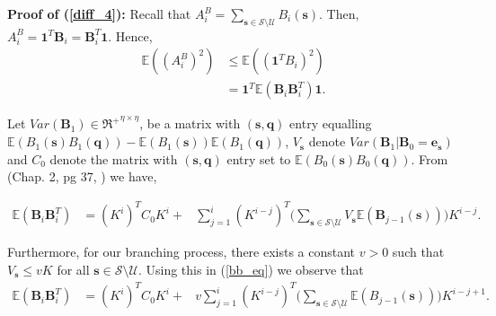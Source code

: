 \documentclass{article}
\theoremstyle{definition}
\newcommand{\lrp}[1]{\left({#1}\right)}
\newcommand{\Exp}[1]{\mathbb{E}\lrp{#1}}
\begin{document}

\noindent \textbf{Proof of (\ref{diff_4}):} Recall that $A^B_i=\sum_{\bm{s}\in \mathcal {S} \setminus \mathcal U}B_i(\bm{s})$. Then, $A^B_i=\bm{1}^T \bm{B}_i= \bm{{B}}_i^T \bm{1}$. Hence,
    \begin{equation} 
      \begin{aligned}
        \Exp{\lrp{A^B_i}^2} &\leq \Exp{(\bm{1}^T {B}_i)^2 } \\
                            &=  \bm{1}^T \Exp{\bm{{B}}_i \bm{{B}}_i^T} \bm{1}.
     \label{affected_square_bound}
      \end{aligned}
    \end{equation}
    
       Let $Var(\bm{B}_1)\in {\Re^+}^{\eta\times\eta}$, be a matrix with $(\bm{s},\bm{q})$ entry equalling $\Exp{B_1(\bm{s})B_1(\bm{q})}-\Exp{B_1(\bm{s})}\Exp{B_1(\bm{q})}$, $V_{\bm{s}}$ denote $Var(\bm{B}_1|\bm{B}_0=\bm{e}_{\bm{s}})$ and $C_0$ denote the matrix with $(\bm{s},\bm{q})$ entry set to $\Exp{B_0(\bm{s})B_0(\bm{q})}$. From (Chap. 2, pg 37, \cite{branching_process_notes_2}) we have,

\begin{equation}
      \begin{aligned}
      \Exp{\bm{{B}}_{i} \bm{{B}}_{i}^T} & = ({K}^i)^T C_0 {K}^i +  &  \sum_{j=1}^{i} ({K}^{i-j})^T \Big(\sum_{\bm{s}\in \mathcal {S} \setminus \mathcal U}V_{\bm{s}}\Exp{\bm{{B}}_{j-1}(\bm{s})}\Big) {K}^{i-j}. 
      \end{aligned}
      \label{bb_eq}
    \end{equation}
 
Furthermore, for our branching process, there exists a constant $v>0$ such that $V_{\bm{s}} \le v {K}$ for all $ \bm{s}\in \mathcal {S} \setminus \mathcal U$. Using this in (\ref{bb_eq}) we observe that
\begin{equation}
      \begin{aligned}
      \Exp{\bm{{B}}_{i} \bm{{B}}^T_{i}} & = ({K}^i)^T C_0 {K}^i +  &  v \sum_{j=1}^{i} ({K}^{i-j})^T \Big(\sum_{\bm{s}\in \mathcal {S} \setminus \mathcal {U}}\Exp{{B}_{j-1}(\bm{s})}\Big) {K}^{i-j+1}.
      \label{matrix_multiply_bound} 
      \end{aligned}
    \end{equation}
 
\end{document}
